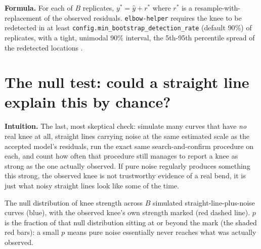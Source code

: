 \documentclass[11pt]{article}
\newcommand{\code}[1]{\texttt{#1}}
\begin{document}
\textbf{Formula.} For each of $B$ replicates, $y^\ast = \hat y + r^\ast$
where $r^\ast$ is a resample-with-replacement of the observed residuals.
\code{elbow-helper} requires the knee to be redetected in at least
\code{config.\allowbreak min\_bootstrap\_detection\_rate} (default $90\%$) of
replicates, with a tight, unimodal 90\% interval, the 5th-95th percentile
spread of the redetected locations \citep{efron1979} \citep{hastie2009esl}.

\section{The null test: could a straight line explain this by chance?}
\label{sec:null-test}

\textbf{Intuition.} The last, most skeptical check: simulate many curves
that have \emph{no} real knee at all, straight lines carrying noise at the
same estimated scale as the accepted model's residuals, run the exact same
search-and-confirm procedure on each, and count how often that procedure
still manages to report a knee as strong as the one actually observed. If
pure noise regularly produces something this strong, the observed knee is
not trustworthy evidence of a real bend, it is just what noisy straight
lines look like some of the time.

\begin{center}
\end{center}
\begin{center}
\footnotesize
The null distribution of knee strength across $B$ simulated
straight-line-plus-noise curves (blue), with the observed knee's own
strength marked (red dashed line). $p$ is the fraction of that null
distribution sitting at or beyond the mark (the shaded red bars): a
small $p$ means pure noise essentially never reaches what was actually
observed.
\end{center}
\end{document}
